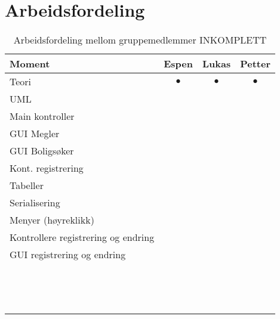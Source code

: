 \section{Arbeidsfordeling}

\begin{table}[ht!]
\caption{Arbeidsfordeling mellom gruppemedlemmer INKOMPLETT}
\label{tab:arbeidsfordeling}
\begin{tabular}{|p{10.8cm}|c|c|c|}

\hline
Moment						&Espen&Lukas	&Petter\\ \hline
Teori						&$\bullet$&$\bullet$&$\bullet$\\	
UML							&&&\\
Main kontroller					&&&\\
GUI Megler					&&&\\
GUI Boligsøker				&&&\\
Kont. registrering							&&&\\
Tabeller							&&&\\
Serialisering							&&&\\
Menyer (høyreklikk)							&&&\\
Kontrollere registrering og endring							&&&\\
GUI registrering og endring							&&&\\
							&&&\\
							&&&\\
							&&&\\
							&&&\\
							&&&\\
							&&&\\
							&&&\\
							&&&\\
							&&&\\
							&&&\\
							&&&\\
							&&&\\
							&&&\\
							&&&\\
\hline
\end{tabular}
\end{table}